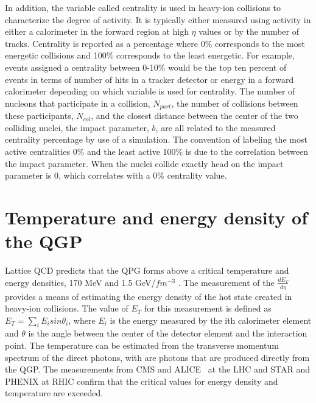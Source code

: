     In addition, the variable called centrality is used in heavy-ion 
      collisions to characterize the degree of activity. 
    It is typically either measured using activity in either a calorimeter in
      the forward region at high $\eta$ values or by the number of tracks.
    Centrality is reported as a percentage where 0\% corresponds to the most 
      energetic collisions and 100\% corresponds to the least energetic.
    For example, events assigned a centrality between 0-10\% would be the 
      top ten percent of events in terms of number of hits in a tracker 
      detector or energy in a forward calorimeter depending on which 
      variable is used for centrality. 
    The number of nucleons that participate in a collision, $N_{part}$,
      the number of collisions between these participants, $N_{col}$, and the
      closest distance between the center of the two colliding nuclei, the 
      impact parameter, $b$, are all related to the measured centrality 
      percentage by use of a simulation. 
    The convention of labeling the most active centralities 0\% and the least
      active 100\% is due to the correlation between the impact parameter.
    When the nuclei collide exactly head on the impact parameter is 0, which 
      correlates with a 0\% centrality value. 

  \section{Temperature and energy density of the QGP}
    Lattice QCD predicts that the QPG forms above a critical temperature and 
      energy densities, 170 MeV and 1.5 GeV/$fm$$^{-3}$ \cite{}.
    The measurement of the $\frac{dE_{T}}{d\eta}$ provides a means of 
      estimating the energy density of the hot state created in heavy-ion
      collisions. 
    The value of $E_{T}$ for this measurement is defined as 
      $E_{T}=\sum_{i}E_{i}sin\theta_{i}$, where $E_{i}$ is the energy measured 
      by the ith calorimeter element and $\theta$ is the angle between the 
      center of the detector element and the interaction point. 
    The temperature can be estimated from the transverse momentum 
      spectrum of the direct photons, with are photons that are produced 
      directly from the QGP.
    The measurements from CMS and ALICE~\cite{Aamodt:2008zz} at the LHC and STAR and PHENIX at RHIC
      confirm that the critical values for energy density and temperature are
      exceeded.

